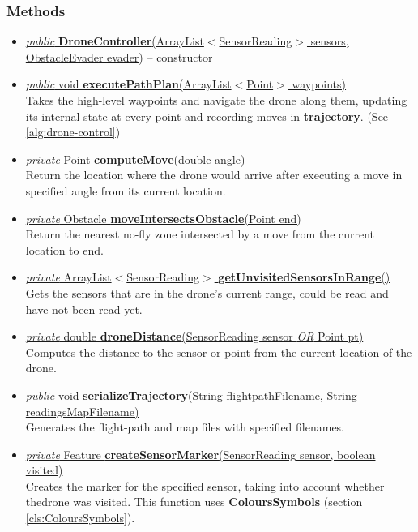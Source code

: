 \documentclass{article}
\newcommand{\sref}[1]{(section \ref{#1})}
\newcommand{\alp}{ArrayList$<$Point$>$}
\newcommand{\method}[4]{\underline{\textit{#1} #2 \textbf{#3}(#4)}}
\begin{document}
\subsubsection*{Methods}

\begin{itemize}
\item \underline{\textit{public} \textbf{DroneController}(ArrayList$<$SensorReading$>$ sensors, ObstacleEvader evader)} -- constructor
\item \method{public}{void}{executePathPlan}{\alp\,\,waypoints} \\
  Takes the high-level waypoints and navigate the drone along them, updating its internal state at every point and recording moves in \textbf{trajectory}. (See \ref{alg:drone-control})
  
\item \method{private}{Point}{computeMove}{double angle} \\
  Return the location where the drone would arrive after executing a move in specified angle from its current location.

\item \method{private}{Obstacle}{moveIntersectsObstacle}{Point end} \\
  Return the nearest no-fly zone intersected by a move from the current location to end.
  
\item \method{private}{ArrayList$<$SensorReading$>$}{getUnvisitedSensorsInRange}{} \\
  Gets the sensors that are in the drone's current range, could be read and have not been read yet.

\item \method{private}{double}{droneDistance}{SensorReading sensor \textit{OR} Point pt} \\
  Computes the distance to the sensor or point from the current location of the drone.

\item \method{public}{void}{serializeTrajectory}{String flightpathFilename, String readingsMapFilename} \\
  Generates the flight-path and map files with specified filenames.

\item \method{private}{Feature}{createSensorMarker}{SensorReading sensor, boolean visited} \\
  Creates the marker for the specified sensor, taking into account whether thedrone was visited. This function uses \textbf{ColoursSymbols} \sref{cls:ColoursSymbols}.
\end{itemize}
\end{document}
